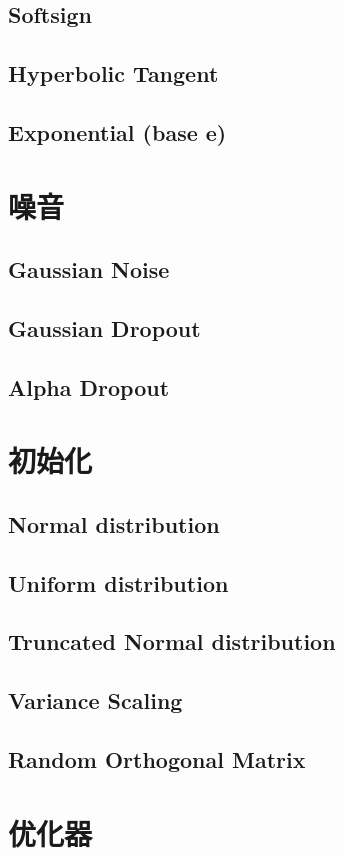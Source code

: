 \documentclass[oneside]{book}
\begin{document}
		\section{Softsign}
		\section{Hyperbolic Tangent}
		\section{Exponential (base e)}

	\chapter{噪音}
		\section{Gaussian Noise}
		\section{Gaussian Dropout}
		\section{Alpha Dropout}

	\chapter{初始化}
		\section{Normal distribution}
		\section{Uniform distribution}
		\section{Truncated Normal distribution}
		\section{Variance Scaling}
		\section{Random Orthogonal Matrix}

	\chapter{优化器}
\end{document}
